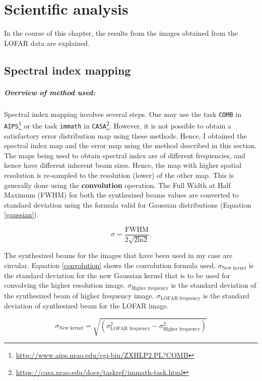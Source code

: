 \documentclass[../main/thesis_msc.tex]{subfiles}
\begin{document}
\chapter{Scientific analysis}
In the course of this chapter, the results from the images obtained from the LOFAR data are explained. 
\section{Spectral index mapping}
\paragraph{Overview of method used:} Spectral index mapping involves several steps. One may use the task \verb|COMB| in \verb|AIPS|\footnote{\url{http://www.aips.nrao.edu/cgi-bin/ZXHLP2.PL?COMB}} or the task \verb|immath| in  \verb|CASA|\footnote{\url{https://casa.nrao.edu/docs/taskref/immath-task.html}}. However, it is not possible to obtain a satisfactory error distribution map using these methods. Hence, I obtained the spectral index map and the error map using the method described in this section. \\

\noindent The maps being used to obtain spectral index are of different frequencies, and hence have different inherent beam sizes. Hence, the map with higher spatial resolution is re-sampled to the resolution (lower) of the other map. This is generally done using the \textbf{convolution} operation. The Full Width at Half Maximum (FWHM) for both the synthesized beams values are converted to standard deviation using the formula valid for Gaussian distributions (Equation \ref{gaussian}).  

\begin{equation}
\sigma=\frac{\mathrm{FWHM}}{2\sqrt{2\textrm{ln}2}}.
\label{gaussian}
\end{equation}

The synthesized beams for the images that have been used in my case are circular. Equation \ref{convolution} shows the convolution formula used. $\sigma_{\textrm{New kernel}}$ is the standard deviation for the new Gaussian kernel that is to be used for convolving the higher resolution image. $\sigma_{\textrm{Higher frequency}}$ is the standard deviation of the synthesized beam of higher frequency image. $\sigma_{\textrm{LOFAR frequency}}$ is the standard deviation of synthesized beam for the LOFAR image. 

\begin{equation}
\sigma_{\textrm{New kernel}}=\sqrt{\left(\sigma_{\textrm{LOFAR frequency}}^2 - \sigma_{\textrm{Higher frequency}}^2\right)}
\label{convolution}
\end{equation}
\end{document}
